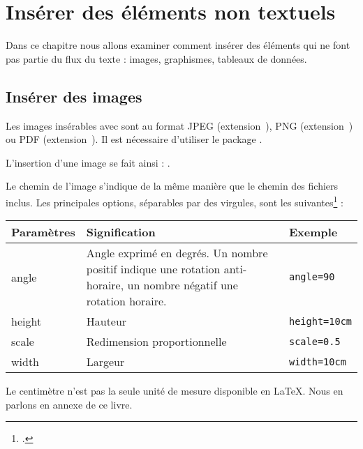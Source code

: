 \chapter{Insérer des éléments non textuels}

\begin{intro}
    Dans ce chapitre nous allons examiner comment insérer des éléments qui ne font pas partie du flux du texte : images, graphismes, tableaux de données.
\end{intro}

\section{Insérer des images}

Les images insérables avec \XeLaTeX sont au format JPEG (extension~), PNG (extension~) ou PDF (extension~). Il est nécessaire d'utiliser le package .


L'insertion d'une image se fait ainsi : .

Le chemin de l'image s'indique de la même manière que le chemin des fichiers inclus.
Les principales options, séparables par des virgules,  sont les suivantes\footcite[Pour les autres, on consultera][]{graphicx_options} :

\begin{longtable}{|p{}|p{}|p{}|}
    \hline
    \centering\textbf{Paramètres} & \centering\textbf{Signification} & \centering\textbf{Exemple}    \tabularnewline
    \hline
    \endhead
    \hline
    \endfoot
    angle        & Angle exprimé en degrés. Un nombre positif indique une rotation anti-horaire, un nombre négatif une rotation horaire.     & \verb|angle=90| \\
    height        & Hauteur    & \verb|height=10cm|     \\
    scale        & Redimension proportionnelle & \verb|scale=0.5|\\
    width        & Largeur     & \verb|width=10cm|     \\
\end{longtable}


\begin{plusloins}
Le centimètre n'est pas la seule  unité de mesure disponible en \LaTeX. Nous en parlons en annexe de ce livre.
\end{plusloins}

